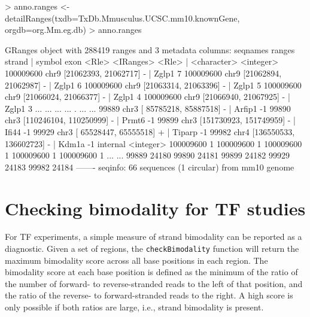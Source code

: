 \documentclass[12pt]{report}
\renewenvironment{Schunk}{\vspace{0pt}}{\vspace{0pt}}
\newcommand{\code}[1]{{\small\texttt{#1}}}
\begin{document}
\begin{Schunk}
\begin{Sinput}
> anno.ranges <- detailRanges(txdb=TxDb.Mmusculus.UCSC.mm10.knownGene, orgdb=org.Mm.eg.db)
> anno.ranges
\end{Sinput}
\begin{Soutput}
GRanges object with 288419 ranges and 3 metadata columns:
            seqnames                 ranges strand |      symbol      exon
               <Rle>              <IRanges>  <Rle> | <character> <integer>
  100009600     chr9   [21062393, 21062717]      - |       Zglp1         7
  100009600     chr9   [21062894, 21062987]      - |       Zglp1         6
  100009600     chr9   [21063314, 21063396]      - |       Zglp1         5
  100009600     chr9   [21066024, 21066377]      - |       Zglp1         4
  100009600     chr9   [21066940, 21067925]      - |       Zglp1         3
        ...      ...                    ...    ... .         ...       ...
      99889     chr3 [ 85785218,  85887518]      - |      Arfip1        -1
      99890     chr3 [110246104, 110250999]      - |       Prmt6        -1
      99899     chr3 [151730923, 151749959]      - |       Ifi44        -1
      99929     chr3 [ 65528447,  65555518]      + |      Tiparp        -1
      99982     chr4 [136550533, 136602723]      - |       Kdm1a        -1
             internal
            <integer>
  100009600         1
  100009600         1
  100009600         1
  100009600         1
  100009600         1
        ...       ...
      99889     24180
      99890     24181
      99899     24182
      99929     24183
      99982     24184
  -------
  seqinfo: 66 sequences (1 circular) from mm10 genome
\end{Soutput}
\end{Schunk}

\section{Checking bimodality for TF studies}
For TF experiments, a simple measure of strand bimodality can be reported as a diagnostic.
Given a set of regions, the \code{checkBimodality} function will return the maximum bimodality score across all base positions in each region.
The bimodality score at each base position is defined as the minimum of the ratio of the number of forward- to reverse-stranded reads to the left of that position, and the ratio of the reverse- to forward-stranded reads to the right.
A high score is only possible if both ratios are large, i.e., strand bimodality is present.
\end{document}
